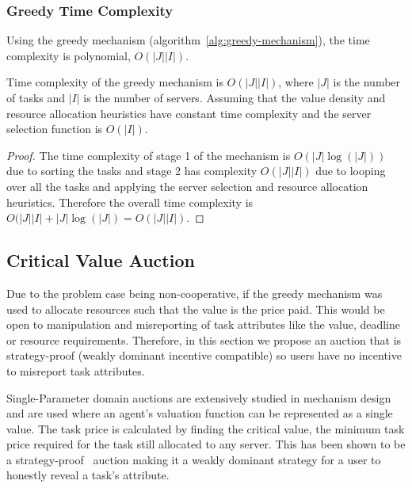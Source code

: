\subsubsection{Greedy Time Complexity}
\label{subsubsec:greedy-time-complexity}
Using the greedy mechanism (algorithm~\ref{alg:greedy-mechanism}), the time complexity is polynomial,
$O(\left|J\right| \left|I\right|)$.
\begin{theorem}
    Time complexity of the greedy mechanism is $O(\left|J\right| \left|I\right|)$, where $\left|J\right|$ is the number
    of tasks and $\left|I\right|$ is the number of servers. Assuming that the value density and resource allocation
    heuristics have constant time complexity and the server selection function is $O(\left|I\right|)$.
\end{theorem}
\begin{proof}
    The time complexity of stage 1 of the mechanism is $O(\left|J\right| \log(\left|J\right|))$ due to sorting the
    tasks and stage 2 has complexity $O(\left|J\right| \left|I\right|)$ due to looping over all the tasks and
    applying the server selection and resource allocation heuristics. Therefore the overall time complexity is
    $O(\left|J\right| \left|I\right| + \left|J\right| \log(\left|J\right|) = O(\left|J\right| \left|I\right|)$.
\end{proof}

\subsection{Critical Value Auction}
\label{subsec:critical-value-auction}
Due to the problem case being non-cooperative, if the greedy mechanism was used to allocate resources such that the
value is the price paid. This would be open to manipulation and misreporting of task attributes like the value,
deadline or resource requirements. Therefore, in this section we propose an auction that is strategy-proof
(weakly dominant incentive compatible) so users have no incentive to misreport task attributes.

Single-Parameter domain auctions are extensively studied in mechanism design~\cite{nisan2007algorithmic_228} and are
used where an agent's valuation function can be represented as a single value. The task price is calculated by finding
the critical value, the minimum task price required for the task still allocated to any server. This has
been shown to be a strategy-proof~\cite{nisan2007algorithmic_229_230} auction making it a weakly dominant strategy for
a user to honestly reveal a task's attribute.

